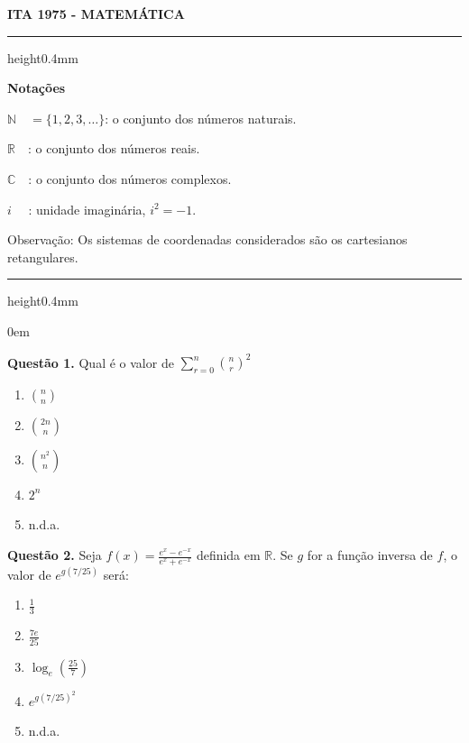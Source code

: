 \documentclass[11pt]{article}
\newcommand*\varhrulefill[1][0.4pt]{\leavevmode\leaders\hrule height#1\hfill\kern0pt}
\begin{document}
\begin{center}
    \textbf{ITA 1975 - MATEMÁTICA}
\end{center}

\noindent\varhrulefill[0.4mm]

\vspace{6pt}

\noindent \textbf{Notações}

\vspace{6pt}

$\mathbb{N}\quad = \{ 1,2,3, \dots \}$: o conjunto dos números naturais.

$\mathbb{R}\quad$: o conjunto dos números reais.

$\mathbb{C}\quad$: o conjunto dos números complexos.

$i \, \, \quad$: unidade imaginária, $i^2 = -1$.

\vspace{6pt}

\noindent Observação: Os sistemas de coordenadas considerados são os cartesianos retangulares.

\noindent\varhrulefill[0.4mm]

\vspace{12pt}

\parindent0em

\textbf{Questão 1.} Qual é o valor de $\displaystyle \sum_{r=0}^{n} \binom{n}{r}^2$

\begin{multicols}{5}
    \begin{enumerate}[\bf A (\quad)]
        \item $\displaystyle \binom{n}{n}$
        \item $\displaystyle \binom{2n}{n}$
        \item $\displaystyle \binom{n^2}{n}$
        \item $\displaystyle 2^n$
        \item n.d.a.
    \end{enumerate}
\end{multicols}


\textbf{Questão 2.} Seja $\displaystyle f(x) = \frac{e^x - e^{-x}}{e^x + e^{-x}}$ definida em $\mathbb{R}$. Se $g$ for a função inversa de $f$, o valor de $\displaystyle e^{g(7/25)}$ será:

\begin{multicols}{5}
    \begin{enumerate}[\bf A (\quad)]
        \item $\displaystyle \frac{1}{3}$
        \item $\displaystyle \frac{7e}{25}$
        \item $\displaystyle \log_e \left( \frac{25}{7} \right)$
        \item $\displaystyle e^{g(7/25)^2}$
        \item n.d.a.
    \end{enumerate}
\end{multicols}
\end{document}
